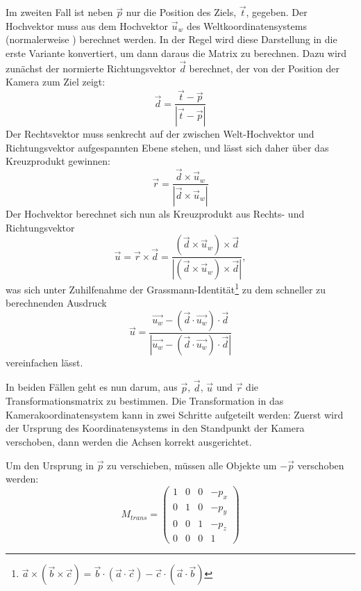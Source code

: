Im zweiten Fall ist neben $\vec p$ nur die Position des Ziels, $\vec t$, gegeben. Der Hochvektor muss aus dem Hochvektor $\vec u_w$ des Weltkoordinatensystems (normalerweise ) berechnet werden. In der Regel wird diese Darstellung in die erste Variante konvertiert, um dann daraus die Matrix zu berechnen. Dazu wird zunächst der normierte Richtungsvektor $\vec d$ berechnet, der von der Position der Kamera zum Ziel zeigt:
\begin{equation}
 \vec d = \frac{\vec t - \vec p}{\left| \vec t - \vec p \right|}
\end{equation}
Der Rechtsvektor muss senkrecht auf der zwischen Welt-Hochvektor und Richtungsvektor aufgespannten Ebene stehen, und lässt sich daher über das Kreuzprodukt gewinnen:
\begin{equation}
 \vec r = \frac{\vec d \times \vec u_w}{\left| \vec d \times \vec u_w \right|}
\end{equation} 
Der Hochvektor berechnet sich nun als Kreuzprodukt aus Rechts- und Richtungsvektor
\begin{equation}
 \vec u = \vec r \times \vec d = \frac{\left( \vec d \times \vec u_w \right) \times \vec d}{\left| \left( \vec d \times \vec u_w \right) \times \vec d \right|},
\end{equation} 
was sich unter Zuhilfenahme der Grassmann-Identität\footnote{$\vec a \times ( \vec b \times \vec c ) = \vec b \cdot ( \vec a \cdot \vec c ) - \vec c \cdot ( \vec a \cdot \vec b)$} zu dem schneller zu berechnenden Ausdruck
\begin{equation}
 \vec u = \frac{ \vec{u_w} - \left( \vec{d} \cdot \vec{u_w} \right) \cdot \vec{d} }{\left| \vec{u_w} - \left( \vec{d} \cdot \vec{u_w} \right) \cdot \vec{d} \right|}
\end{equation} 
vereinfachen lässt.

In beiden Fällen geht es nun darum, aus $\vec p$, $\vec d$, $\vec u$ und $\vec r$ die Transformationsmatrix zu bestimmen. Die Transformation in das Kamerakoordinatensystem kann in zwei Schritte aufgeteilt werden: Zuerst wird der Ursprung des Koordinatensystems in den Standpunkt der Kamera verschoben, dann werden die Achsen korrekt ausgerichtet.

Um den Ursprung in $\vec p$ zu verschieben, müssen alle Objekte um $-\vec p$ verschoben werden:
\begin{equation}
 M_{trans} = \begin{pmatrix}
  1 & 0 & 0 & -p_x \\
  0 & 1 & 0 & -p_y \\
  0 & 0 & 1 & -p_z \\
  0 & 0 & 0 & 1
 \end{pmatrix}
\end{equation}

